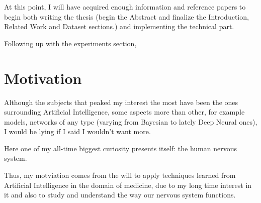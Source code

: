 \documentclass[a4paper]{article} %
\begin{document}
At this point, I will have acquired enough information and reference papers to begin both writing the thesis (begin the
Abstract and finalize the Introduction, Related Work and Dataset sections.) and implementing the technical part.

Following up with the experiments section,

\section{Motivation}
Although the subjects that peaked my interest the most have been the ones surrounding Artificial Intelligence,
some aspects more than other, for example models, networks of any type (varying from Bayesian to lately Deep Neural ones),
I would be lying if I said I wouldn't want more.

Here one of my all-time biggest curiosity presents itself: the human nervous system.

Thus, my motviation comes from the will to apply techniques learned from Artificial Intelligence in the domain of medicine,
due to my long time interest in it and also to study and understand the way our nervous system functions.
\end{document}
